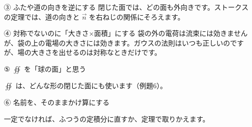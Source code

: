 \begin{tsumazuki}{③ ふたや道の向きを逆にする}
閉じた面では、どの面も外向きです。ストークスの定理では、道の向きと $\vec n$ を右ねじの関係にそろえます。
\end{tsumazuki}

\begin{tsumazuki}{④ 対称でないのに「大きさ×面積」にする}
袋の外の電荷は流束には効きませんが、袋の上の電場の大きさには効きます。ガウスの法則はいつも正しいのですが、場の大きさを出せるのは対称なときだけです。
\end{tsumazuki}

\begingroup{}%
\noindent\begin{minipage}[t]{0.485\linewidth}\vspace{0pt}
\begin{tsumazuki}{⑤ $\oiint$ を「球の面」と思う}
\raggedright{}
$\oiint$ は、どんな形の閉じた面にも使います（例題6）。
\end{tsumazuki}
\end{minipage}\hfill
\begin{minipage}[t]{0.485\linewidth}\vspace{0pt}
\begin{tsumazuki}{⑥ 名前を、そのままかけ算にする}
\raggedright{}
一定でなければ、ふつうの定積分に直すか、定理で取りかえます。
\end{tsumazuki}
\end{minipage}\par
\endgroup

